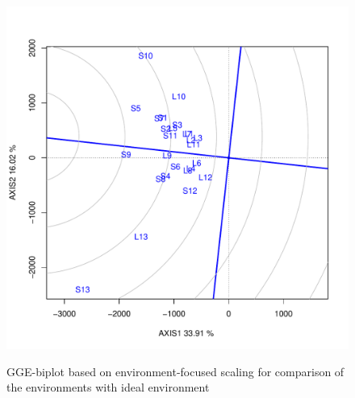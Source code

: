\begin{figure} [H]
	\centering  
	\scalebox{0.3}
	{\includegraphics[width=490mm]{02ThesisMain/Ch04RD/figures/idealE}}
	\caption[comparison the environments with ideal environment]{GGE-biplot based on environment-focused scaling for comparison of the environments with ideal environment}
\label{Figure:4.8}
\end{figure}

